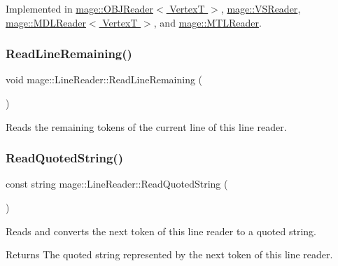 Implemented in \hyperlink{classmage_1_1_o_b_j_reader_a8d4bd7be6de3098ba899cc36e3be1283}{mage\+::\+O\+B\+J\+Reader$<$ Vertex\+T $>$}, \hyperlink{classmage_1_1_v_s_reader_a3a3ba09b410e2144ed082db5f1da3113}{mage\+::\+V\+S\+Reader}, \hyperlink{classmage_1_1_m_d_l_reader_ac50f9cce64621b0a218b6778a611a702}{mage\+::\+M\+D\+L\+Reader$<$ Vertex\+T $>$}, and \hyperlink{classmage_1_1_m_t_l_reader_ac3981549364be195f96b32cfafc8b147}{mage\+::\+M\+T\+L\+Reader}.

\hypertarget{classmage_1_1_line_reader_a3a4b99bfef1e8a826d74a01bcc663fcb}{}\label{classmage_1_1_line_reader_a3a4b99bfef1e8a826d74a01bcc663fcb} 
\subsubsection{\texorpdfstring{Read\+Line\+Remaining()}{ReadLineRemaining()}}
{\footnotesize\ttfamily void mage\+::\+Line\+Reader\+::\+Read\+Line\+Remaining (\begin{DoxyParamCaption}{ }\end{DoxyParamCaption})\hspace{0.3cm}{\ttfamily [protected]}}

Reads the remaining tokens of the current line of this line reader. \hypertarget{classmage_1_1_line_reader_ae9a7547d01b29c3237b198444d4f3aef}{}\label{classmage_1_1_line_reader_ae9a7547d01b29c3237b198444d4f3aef} 
\subsubsection{\texorpdfstring{Read\+Quoted\+String()}{ReadQuotedString()}}
{\footnotesize\ttfamily const string mage\+::\+Line\+Reader\+::\+Read\+Quoted\+String (\begin{DoxyParamCaption}{ }\end{DoxyParamCaption})\hspace{0.3cm}{\ttfamily [protected]}}

Reads and converts the next token of this line reader to a quoted string.

\begin{DoxyReturn}{Returns}
The quoted string represented by the next token of this line reader. 
\end{DoxyReturn}

